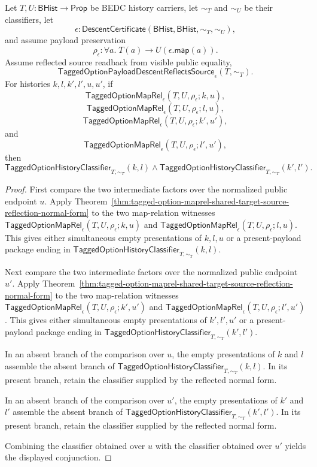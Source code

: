 \begin{theorem}
\label{thm:tagged-option-composite-image-classifier-normalized-intermediate-factor-coherence}
Let $T,U:\mathsf{BHist}\to\mathsf{Prop}$ be BEDC history carriers, let
$\sim_T$ and $\sim_U$ be their classifiers, let
$$
\epsilon:\mathsf{DescentCertificate}(\mathsf{BHist},\mathsf{BHist},\sim_T,\sim_U),
$$
and assume payload preservation
$$
\rho_{\epsilon}:\forall a.\;T(a)\to U(\epsilon.\mathsf{map}(a)).
$$
Assume reflected source readback from visible public equality,
$$
\mathsf{TaggedOptionPayloadDescentReflectsSource}_{\epsilon}(T,\sim_T).
$$
For histories $k,l,k',l',u,u'$, if
$$
\mathsf{TaggedOptionMapRel}_{\epsilon}(T,U,\rho_{\epsilon};k,u),
$$
$$
\mathsf{TaggedOptionMapRel}_{\epsilon}(T,U,\rho_{\epsilon};l,u),
$$
$$
\mathsf{TaggedOptionMapRel}_{\epsilon}(T,U,\rho_{\epsilon};k',u'),
$$
and
$$
\mathsf{TaggedOptionMapRel}_{\epsilon}(T,U,\rho_{\epsilon};l',u'),
$$
then
$$
\mathsf{TaggedOptionHistoryClassifier}_{T,\sim_T}(k,l)
\land
\mathsf{TaggedOptionHistoryClassifier}_{T,\sim_T}(k',l').
$$
\end{theorem}
\begin{proof}
First compare the two intermediate factors over the normalized public endpoint
$u$. Apply
Theorem~\ref{thm:tagged-option-maprel-shared-target-source-reflection-normal-form}
to the two map-relation witnesses
$\mathsf{TaggedOptionMapRel}_{\epsilon}(T,U,\rho_{\epsilon};k,u)$ and
$\mathsf{TaggedOptionMapRel}_{\epsilon}(T,U,\rho_{\epsilon};l,u)$. This gives
either simultaneous empty presentations of $k,l,u$ or a present-payload package
ending in $\mathsf{TaggedOptionHistoryClassifier}_{T,\sim_T}(k,l)$.

Next compare the two intermediate factors over the normalized public endpoint
$u'$. Apply
Theorem~\ref{thm:tagged-option-maprel-shared-target-source-reflection-normal-form}
to the two map-relation witnesses
$\mathsf{TaggedOptionMapRel}_{\epsilon}(T,U,\rho_{\epsilon};k',u')$ and
$\mathsf{TaggedOptionMapRel}_{\epsilon}(T,U,\rho_{\epsilon};l',u')$. This gives
either simultaneous empty presentations of $k',l',u'$ or a present-payload
package ending in $\mathsf{TaggedOptionHistoryClassifier}_{T,\sim_T}(k',l')$.

In an absent branch of the comparison over $u$, the empty presentations of $k$
and $l$ assemble the absent branch of
$\mathsf{TaggedOptionHistoryClassifier}_{T,\sim_T}(k,l)$. In its present branch,
retain the classifier supplied by the reflected normal form.

In an absent branch of the comparison over $u'$, the empty presentations of $k'$
and $l'$ assemble the absent branch of
$\mathsf{TaggedOptionHistoryClassifier}_{T,\sim_T}(k',l')$. In its present
branch, retain the classifier supplied by the reflected normal form.

Combining the classifier obtained over $u$ with the classifier obtained over
$u'$ yields the displayed conjunction.
\end{proof}

